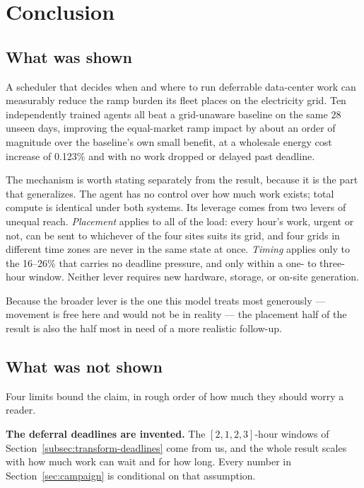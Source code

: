 ﻿\documentclass[12pt]{article}
\begin{document}
\section{Conclusion}
\label{sec:conclusion}

\subsection{What was shown}
\label{subsec:conclusion-shown}

A scheduler that decides when and where to run deferrable data-center work can
measurably reduce the ramp burden its fleet places on the electricity grid. Ten
independently trained agents all beat a grid-unaware baseline on the same 28
unseen days, improving the equal-market ramp impact by about an order of
magnitude over the baseline's own small benefit, at a wholesale energy cost
increase of 0.123\% and with no work dropped or delayed past deadline.

The mechanism is worth stating separately from the result, because it is the
part that generalizes. The agent has no control over how much work exists; total
compute is identical under both systems. Its leverage comes from two levers of
unequal reach. \emph{Placement} applies to all of the load: every hour's work,
urgent or not, can be sent to whichever of the four sites suits its grid, and
four grids in different time zones are never in the same state at once.
\emph{Timing} applies only to the 16--26\% that carries no deadline pressure,
and only within a one- to three-hour window. Neither lever requires new
hardware, storage, or on-site generation.

Because the broader lever is the one this model treats most generously ---
movement is free here and would not be in reality --- the placement half of the
result is also the half most in need of a more realistic follow-up.

\subsection{What was not shown}
\label{subsec:conclusion-notshown}

Four limits bound the claim, in rough order of how much they should worry a
reader.

\textbf{The deferral deadlines are invented.} The \([2,1,2,3]\)-hour windows of
Section~\ref{subsec:transform-deadlines} come from us, and the whole result
scales with how much work can wait and for how long. Every number in
Section~\ref{sec:campaign} is conditional on that assumption.
\end{document}
